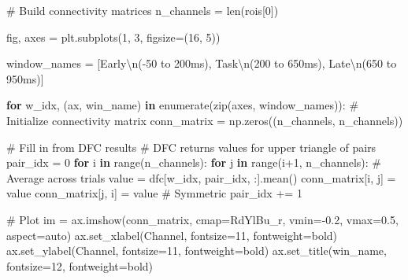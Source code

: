 \documentclass[
  11pt,
  letterpaper,
  oneside,
  openany]{book}
\newenvironment{Shaded}{\begin{snugshade}}{\end{snugshade}}
\newcommand{\BuiltInTok}[1]{\textcolor[rgb]{0.00,0.23,0.31}{#1}}
\newcommand{\CharTok}[1]{\textcolor[rgb]{0.13,0.47,0.30}{#1}}
\newcommand{\CommentTok}[1]{\textcolor[rgb]{0.37,0.37,0.37}{#1}}
\newcommand{\ControlFlowTok}[1]{\textcolor[rgb]{0.00,0.23,0.31}{\textbf{#1}}}
\newcommand{\DecValTok}[1]{\textcolor[rgb]{0.68,0.00,0.00}{#1}}
\newcommand{\FloatTok}[1]{\textcolor[rgb]{0.68,0.00,0.00}{#1}}
\newcommand{\KeywordTok}[1]{\textcolor[rgb]{0.00,0.23,0.31}{\textbf{#1}}}
\newcommand{\NormalTok}[1]{\textcolor[rgb]{0.00,0.23,0.31}{#1}}
\newcommand{\OperatorTok}[1]{\textcolor[rgb]{0.37,0.37,0.37}{#1}}
\newcommand{\StringTok}[1]{\textcolor[rgb]{0.13,0.47,0.30}{#1}}
\begin{document}
\begin{Shaded}
\begin{Highlighting}[]
\CommentTok{\# Build connectivity matrices}
\NormalTok{n\_channels }\OperatorTok{=} \BuiltInTok{len}\NormalTok{(rois[}\DecValTok{0}\NormalTok{])}

\NormalTok{fig, axes }\OperatorTok{=}\NormalTok{ plt.subplots(}\DecValTok{1}\NormalTok{, }\DecValTok{3}\NormalTok{, figsize}\OperatorTok{=}\NormalTok{(}\DecValTok{16}\NormalTok{, }\DecValTok{5}\NormalTok{))}

\NormalTok{window\_names }\OperatorTok{=}\NormalTok{ [}\StringTok{\textquotesingle{}Early}\CharTok{\textbackslash{}n}\StringTok{({-}50 to 200ms)\textquotesingle{}}\NormalTok{, }\StringTok{\textquotesingle{}Task}\CharTok{\textbackslash{}n}\StringTok{(200 to 650ms)\textquotesingle{}}\NormalTok{, }\StringTok{\textquotesingle{}Late}\CharTok{\textbackslash{}n}\StringTok{(650 to 950ms)\textquotesingle{}}\NormalTok{]}

\ControlFlowTok{for}\NormalTok{ w\_idx, (ax, win\_name) }\KeywordTok{in} \BuiltInTok{enumerate}\NormalTok{(}\BuiltInTok{zip}\NormalTok{(axes, window\_names)):}
    \CommentTok{\# Initialize connectivity matrix}
\NormalTok{    conn\_matrix }\OperatorTok{=}\NormalTok{ np.zeros((n\_channels, n\_channels))}
    
    \CommentTok{\# Fill in from DFC results}
    \CommentTok{\# DFC returns values for upper triangle of pairs}
\NormalTok{    pair\_idx }\OperatorTok{=} \DecValTok{0}
    \ControlFlowTok{for}\NormalTok{ i }\KeywordTok{in} \BuiltInTok{range}\NormalTok{(n\_channels):}
        \ControlFlowTok{for}\NormalTok{ j }\KeywordTok{in} \BuiltInTok{range}\NormalTok{(i}\OperatorTok{+}\DecValTok{1}\NormalTok{, n\_channels):}
            \CommentTok{\# Average across trials}
\NormalTok{            value }\OperatorTok{=}\NormalTok{ dfc[w\_idx, pair\_idx, :].mean()}
\NormalTok{            conn\_matrix[i, j] }\OperatorTok{=}\NormalTok{ value}
\NormalTok{            conn\_matrix[j, i] }\OperatorTok{=}\NormalTok{ value  }\CommentTok{\# Symmetric}
\NormalTok{            pair\_idx }\OperatorTok{+=} \DecValTok{1}
    
    \CommentTok{\# Plot}
\NormalTok{    im }\OperatorTok{=}\NormalTok{ ax.imshow(conn\_matrix, cmap}\OperatorTok{=}\StringTok{\textquotesingle{}RdYlBu\_r\textquotesingle{}}\NormalTok{, vmin}\OperatorTok{={-}}\FloatTok{0.2}\NormalTok{, vmax}\OperatorTok{=}\FloatTok{0.5}\NormalTok{,}
\NormalTok{                   aspect}\OperatorTok{=}\StringTok{\textquotesingle{}auto\textquotesingle{}}\NormalTok{)}
\NormalTok{    ax.set\_xlabel(}\StringTok{\textquotesingle{}Channel\textquotesingle{}}\NormalTok{, fontsize}\OperatorTok{=}\DecValTok{11}\NormalTok{, fontweight}\OperatorTok{=}\StringTok{\textquotesingle{}bold\textquotesingle{}}\NormalTok{)}
\NormalTok{    ax.set\_ylabel(}\StringTok{\textquotesingle{}Channel\textquotesingle{}}\NormalTok{, fontsize}\OperatorTok{=}\DecValTok{11}\NormalTok{, fontweight}\OperatorTok{=}\StringTok{\textquotesingle{}bold\textquotesingle{}}\NormalTok{)}
\NormalTok{    ax.set\_title(win\_name, fontsize}\OperatorTok{=}\DecValTok{12}\NormalTok{, fontweight}\OperatorTok{=}\StringTok{\textquotesingle{}bold\textquotesingle{}}\NormalTok{)}
    

\end{Highlighting}
\end{Shaded}
\end{document}
